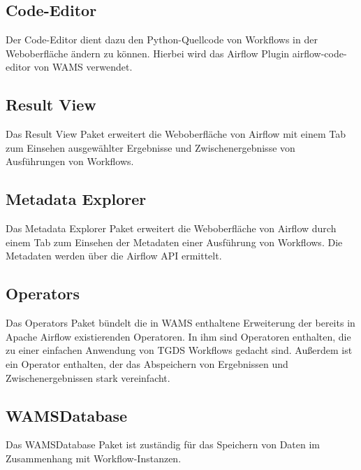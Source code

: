 \subsection*{Code-Editor}
Der Code-Editor dient dazu den Python-Quellcode von Workflows in der Weboberfläche ändern zu können.
Hierbei wird das Airflow Plugin \gls{airflow-code-editor} von WAMS verwendet.

\subsection*{Result View}
Das Result View Paket erweitert die Weboberfläche von Airflow mit einem Tab zum Einsehen ausgewählter Ergebnisse und Zwischenergebnisse von Ausführungen von Workflows. 


\subsection*{Metadata Explorer}
Das Metadata Explorer Paket erweitert die Weboberfläche von Airflow durch einem Tab zum Einsehen der Metadaten einer Ausführung von Workflows. Die Metadaten werden über die Airflow API ermittelt.

\subsection*{Operators}
Das Operators Paket bündelt die in WAMS enthaltene Erweiterung der bereits in Apache Airflow existierenden Operatoren. 
In ihm sind Operatoren enthalten, die zu einer einfachen Anwendung von TGDS Workflows gedacht sind.
Außerdem ist ein Operator enthalten, der das Abspeichern von Ergebnissen und Zwischenergebnissen stark vereinfacht.

\subsection*{WAMSDatabase}
Das WAMSDatabase Paket ist zuständig für das Speichern von Daten im Zusammenhang mit Workflow-Instanzen.
